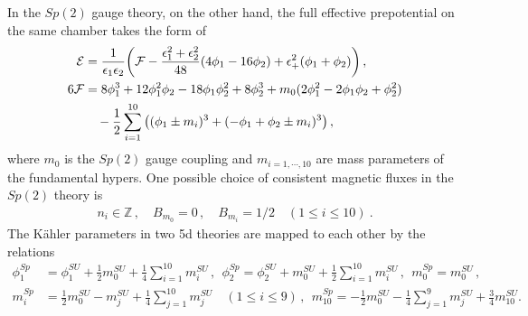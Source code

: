 In the $ Sp(2) $ gauge theory, on the other hand, the full effective prepotential on the same chamber takes the form of
\begin{align}
\mathcal{E}
&= \frac{1}{\epsilon_1 \epsilon_2} \qty(\mathcal{F} - \frac{\epsilon_1^2 + \epsilon_2^2}{48} (4\phi_1 - 16\phi_2) + \epsilon_+^2 (\phi_1 + \phi_2)) \,, \nonumber \\
6\mathcal{F}
&= 8\phi_1^3 + 12\phi_1^2 \phi_2 - 18\phi_1 \phi_2^2 + 8\phi_2^3 + m_0(2\phi_1^2 - 2\phi_1 \phi_2 + \phi_2^2)  \nonumber\\
& \quad - \frac{1}{2}\sum_{i=1}^{10} \qty((\phi_1 \pm m_i)^3 + (-\phi_1 + \phi_2 \pm m_i)^3 )\,,  
\end{align}
where $ m_0 $ is the $ Sp(2) $ gauge coupling and $ m_{i=1, \cdots, 10} $ are mass parameters of the fundamental hypers. 
One possible choice of consistent magnetic fluxes in the $Sp(2)$ theory is
\begin{align}
n_i \in \mathbb{Z} \, , \quad
B_{m_0} = 0 \, , \quad
B_{m_i} = 1/2 \quad (1 \leq i \leq 10) \ .
\end{align}
The K\"ahler parameters in two 5d theories are mapped to each other by the relations \cite{Hayashi:2016abm}
\begin{align}
\phi_1^{Sp} &= \phi_1^{SU} + \frac{1}{2}m_0^{SU} + \frac{1}{4}\sum_{i=1}^{10} m_i^{SU} \,, \ \
\phi_2^{Sp} = \phi_2^{SU} + m_0^{SU} + \frac{1}{2}\sum_{i=1}^{10} m_i^{SU} \,, \ \ m_0^{Sp} = m_0^{SU} \,, \nonumber \\
m_i^{Sp} &= \frac{1}{2} m_0^{SU} - m_j^{SU} + \frac{1}{4}\sum_{j=1}^{10} m_j^{SU} \quad (1 \leq i \leq 9) \,, \ \
m_{10}^{Sp} = -\frac{1}{2} m_0^{SU} - \frac{1}{4}\sum_{j=1}^{9} m_j^{SU} + \frac{3}{4} m_{10}^{SU} .
\end{align} 

